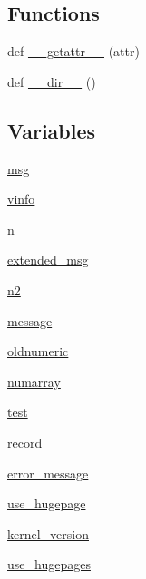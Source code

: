 \subsection*{Functions}
\begin{DoxyCompactItemize}
\item 
def \hyperlink{namespacenumpy_a769fc49989b89b83a8a22d1fc5957707}{\+\_\+\+\_\+getattr\+\_\+\+\_\+} (attr)
\item 
def \hyperlink{namespacenumpy_a05ae198afa113ce10c617885c28b79fa}{\+\_\+\+\_\+dir\+\_\+\+\_\+} ()
\end{DoxyCompactItemize}
\subsection*{Variables}
\begin{DoxyCompactItemize}
\item 
\hyperlink{namespacenumpy_ab96122eb8e44294b488b0ef93ec27d38}{msg}
\item 
\hyperlink{namespacenumpy_ad57cc1f157391df7570bccf725ba5abf}{vinfo}
\item 
\hyperlink{namespacenumpy_a352663c52853d2754274407d5cae2832}{n}
\item 
\hyperlink{namespacenumpy_a212925a5ecfb70237012aaee36a44789}{extended\+\_\+msg}
\item 
\hyperlink{namespacenumpy_a59b0d7baee040fdd1da26565c4ca2408}{n2}
\item 
\hyperlink{namespacenumpy_a2222f7c2b3c819deee274f05ccc2a705}{message}
\item 
\hyperlink{namespacenumpy_a8dc6952b5a0171808a2f920142d8403e}{oldnumeric}
\item 
\hyperlink{namespacenumpy_a91810bdd8fe09a74518e2b6f6efc0645}{numarray}
\item 
\hyperlink{namespacenumpy_a940b21ea81a40752b492a99b786f0718}{test}
\item 
\hyperlink{namespacenumpy_a26b7b29ce31118456a3c197e73d945bc}{record}
\item 
\hyperlink{namespacenumpy_ad70b9a8ab78be689bf073dc3a65b1096}{error\+\_\+message}
\item 
\hyperlink{namespacenumpy_ac2b03242e859c2749c9ab46cb321221c}{use\+\_\+hugepage}
\item 
\hyperlink{namespacenumpy_aaf7d214394ee08d6424d0b598a590ac7}{kernel\+\_\+version}
\item 
\hyperlink{namespacenumpy_a00cdcc15f38e00325dc285f9f4f275c8}{use\+\_\+hugepages}
\end{DoxyCompactItemize}


